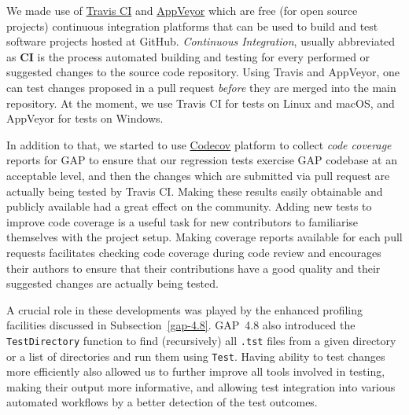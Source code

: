 \documentclass{deliverablereport}
\begin{document}
We made use of \href{https://travis-ci.org/}{Travis CI} and
\href{https://www.appveyor.com/}{AppVeyor} which are 
free (for open source projects) continuous integration platforms 
that can be used to build and test software projects hosted at GitHub.
\emph{Continuous Integration}, usually abbreviated as {\bf CI} is the process
automated building and testing for every performed or suggested changes to 
the source code repository. Using Travis and AppVeyor, one can test changes proposed
in a pull request \emph{before} they are merged into the main repository.
At the moment, we use Travis CI for tests on Linux and macOS, and 
AppVeyor for tests on Windows.

In addition to that, we started to use \href{https://codecov.io/}{Codecov}
platform to collect \emph{code coverage} reports for GAP to ensure that our
regression tests exercise GAP codebase at an acceptable level, and then
the changes which are submitted via pull request are actually being tested
by Travis CI. Making these results easily obtainable and publicly available
had a great effect on the community. Adding new tests to improve code coverage
is a useful task for new contributors to familiarise themselves with the
project setup. Making coverage reports available for each pull requests
facilitates checking code coverage during code review and
encourages their authors to ensure that their contributions have a good
quality and their suggested changes are actually being tested. 

A crucial role in these developments was played by the enhanced
profiling facilities discussed 
in Subsection~\ref{gap-4.8}. 
GAP~4.8 also introduced the {\tt TestDirectory} function to find
(recursively) all {\tt .tst} files from a given directory or a list of 
directories and run them using {\tt Test}. Having ability to test
changes more efficiently also allowed us to further improve all 
tools involved in testing, making their output more informative,
and allowing test integration into various automated workflows
by a better detection of the test outcomes. %
\end{document}
